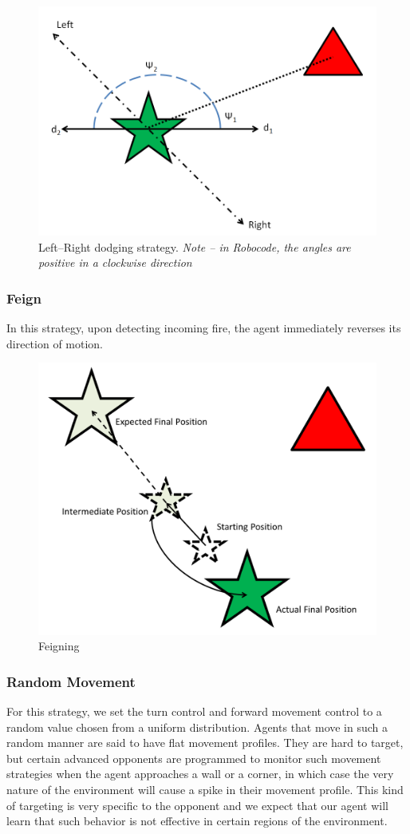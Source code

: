 \documentclass{article}
\theoremstyle{plain}
\theoremstyle{definition}
\theoremstyle{remark}
\begin{document}
\begin{figure}[h]
	\centering
		\includegraphics[width=7 cm]{LR}
	\caption{Left--Right dodging strategy. \emph{Note -- in Robocode, the angles are positive in a clockwise direction}}
	\label{LR}
\end{figure}

\subsubsection*{Feign}
In this strategy, upon detecting incoming fire, the agent immediately reverses its direction of motion.

\begin{figure}[h]
	\centering
		\includegraphics[width=7 cm]{Feign.png}
	\caption{Feigning}
	\label{feign}
\end{figure}


\subsubsection*{Random Movement}
For this strategy, we set the turn control and forward movement control to a random value chosen from a uniform distribution. Agents that move in such a random manner are said to have flat movement profiles. They are hard to target, but certain advanced opponents are programmed to monitor such movement strategies when the agent approaches a wall or a corner, in which case the very nature of the environment will cause a spike in their movement profile. This kind of targeting is very specific to the opponent and we expect that our agent will learn that such behavior is not effective in certain regions of the environment.
\end{document}
